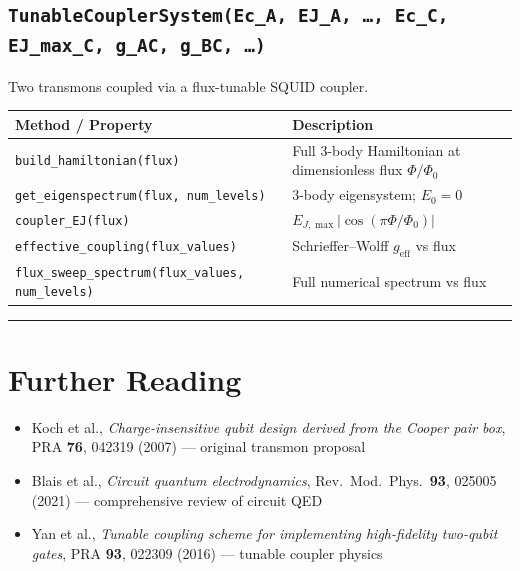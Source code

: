 \documentclass[11pt]{article}
\begin{document}
\subsection{\texttt{TunableCouplerSystem(Ec\_A, EJ\_A, \ldots, Ec\_C, EJ\_max\_C, g\_AC, g\_BC, \ldots)}}

Two transmons coupled via a flux-tunable SQUID coupler.

\begin{center}
\begin{tabular}{@{}ll@{}}
\toprule
Method / Property & Description \\
\midrule
\texttt{build\_hamiltonian(flux)} & Full 3-body Hamiltonian at dimensionless flux $\Phi/\Phi_0$ \\
\texttt{get\_eigenspectrum(flux, num\_levels)} & 3-body eigensystem; $E_0 = 0$ \\
\texttt{coupler\_EJ(flux)} & $E_{J,\max}|\cos(\pi\Phi/\Phi_0)|$ \\
\texttt{effective\_coupling(flux\_values)} & Schrieffer--Wolff $g_\text{eff}$ vs flux \\
\texttt{flux\_sweep\_spectrum(flux\_values, num\_levels)} & Full numerical spectrum vs flux \\
\bottomrule
\end{tabular}
\end{center}

\hrule
\vspace{1em}

\section{Further Reading}

\begin{itemize}
  \item Koch et al., \textit{Charge-insensitive qubit design derived from the Cooper pair box},
        PRA \textbf{76}, 042319 (2007) --- original transmon proposal
  \item Blais et al., \textit{Circuit quantum electrodynamics},
        Rev.\ Mod.\ Phys.\ \textbf{93}, 025005 (2021) --- comprehensive review of circuit QED
  \item Yan et al., \textit{Tunable coupling scheme for implementing high-fidelity two-qubit
        gates}, PRA \textbf{93}, 022309 (2016) --- tunable coupler physics
\end{itemize}
\end{document}
